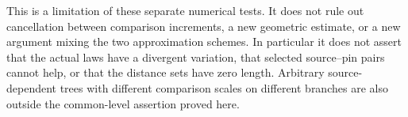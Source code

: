 This is a limitation of these separate numerical tests. It does not
rule out cancellation between comparison increments, a new geometric
estimate, or a new argument mixing the two approximation schemes.
In particular it does not assert that the actual laws have a divergent
variation, that selected source--pin pairs cannot help, or that the
distance sets have zero length. Arbitrary source-dependent trees with
different comparison scales on different branches are also outside
the common-level assertion proved here.
